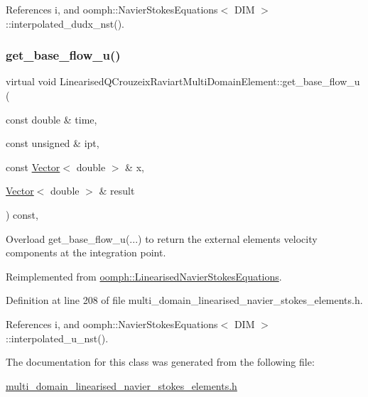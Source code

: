 References i, and oomph\+::\+Navier\+Stokes\+Equations$<$ D\+I\+M $>$\+::interpolated\+\_\+dudx\+\_\+nst().

\mbox{\label{classLinearisedQCrouzeixRaviartMultiDomainElement_afb43b8c81d6421ce18f5d07bda931621}} 
\subsubsection{\texorpdfstring{get\+\_\+base\+\_\+flow\+\_\+u()}{get\_base\_flow\_u()}}
{\footnotesize\ttfamily virtual void Linearised\+Q\+Crouzeix\+Raviart\+Multi\+Domain\+Element\+::get\+\_\+base\+\_\+flow\+\_\+u (\begin{DoxyParamCaption}\item[{const double \&}]{time,  }\item[{const unsigned \&}]{ipt,  }\item[{const \hyperlink{classoomph_1_1Vector}{Vector}$<$ double $>$ \&}]{x,  }\item[{\hyperlink{classoomph_1_1Vector}{Vector}$<$ double $>$ \&}]{result }\end{DoxyParamCaption}) const\hspace{0.3cm}{\ttfamily [inline]}, {\ttfamily [virtual]}}



Overload get\+\_\+base\+\_\+flow\+\_\+u(...) to return the external element\textquotesingle{}s velocity components at the integration point. 



Reimplemented from \hyperlink{classoomph_1_1LinearisedNavierStokesEquations_a7c219a316dbe67ef01f8c5b666e0c9ae}{oomph\+::\+Linearised\+Navier\+Stokes\+Equations}.



Definition at line 208 of file multi\+\_\+domain\+\_\+linearised\+\_\+navier\+\_\+stokes\+\_\+elements.\+h.



References i, and oomph\+::\+Navier\+Stokes\+Equations$<$ D\+I\+M $>$\+::interpolated\+\_\+u\+\_\+nst().



The documentation for this class was generated from the following file\+:\begin{DoxyCompactItemize}
\item 
\hyperlink{multi__domain__linearised__navier__stokes__elements_8h}{multi\+\_\+domain\+\_\+linearised\+\_\+navier\+\_\+stokes\+\_\+elements.\+h}\end{DoxyCompactItemize}
